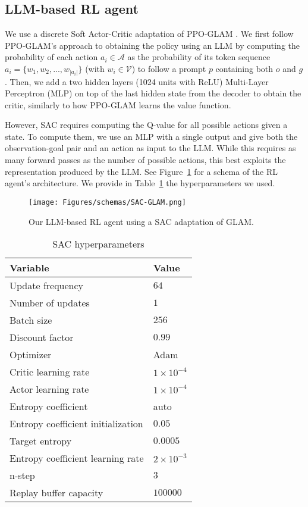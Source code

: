 \label{app:implementation_details}
\subsection{LLM-based RL agent}\label{app:sac_glam}
We use a discrete Soft Actor-Critic \cite{Christodoulou2019SoftAF} adaptation of PPO-GLAM \cite{carta_grounding_2023}.
We first follow PPO-GLAM's approach to obtaining the policy using an LLM by computing the probability of each action $ a_i \in \mathcal{A} $ as the probability of its token sequence $ a_i = \{ w_1, w_2, ..., w_{|a_i|} \} $ (with $w_i \in \mathcal{V} $) to follow a prompt $p$ containing both $o$ and $g$.
Then, we add a two hidden layers (1024 units with ReLU) Multi-Layer Perceptron (MLP) on top of the last hidden state from the decoder to obtain the critic, similarly to how PPO-GLAM learns the value function.

However, SAC requires computing the Q-value for all possible actions given a state. To compute them, we use an MLP with a single output and give both the observation-goal pair and an action as input to the LLM. While this requires as many forward passes as the number of possible actions, this best exploits the representation produced by the LLM. See Figure~\ref{fig:sac_glam} for a schema of the RL agent's architecture. We provide in Table~\ref{tab:sac_param} the hyperparameters we used.

\begin{figure}[!ht]
    \centering
    \texttt{[image: Figures/schemas/SAC-GLAM.png]}
    \caption{Our LLM-based RL agent using a SAC adaptation of GLAM.}
    \label{fig:sac_glam}
\end{figure}

\begin{table}[!ht]
    \caption{SAC hyperparameters}
    \centering 
    \begin{tabular}{ll}
    \hline
    \textbf{Variable} & \textbf{Value} \\
    \hline
    Update frequency & $64$ \\
    Number of updates & $1$ \\
    Batch size & $256$ \\
    Discount factor & $0.99$ \\
    Optimizer & Adam \\
    Critic learning rate & $1 \times 10^{-4}$ \\
    Actor learning rate & $1 \times 10^{-4}$ \\
    Entropy coefficient & auto \\
    Entropy coefficient initialization & $0.05$ \\
    Target entropy & $0.0005$ \\
    Entropy coefficient learning rate & $2 \times 10^{-3}$ \\
    n-step & $3$ \\
    Replay buffer capacity & $100000$ \\
    \hline
    \end{tabular}
    \label{tab:sac_param}
\end{table}

